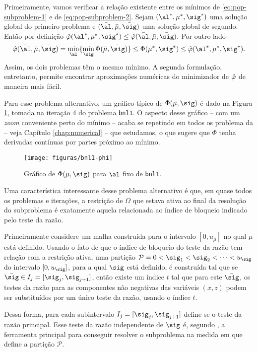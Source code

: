 Primeiramente, vamos verificar a relação existente entre os mínimos de \eqref{eq:pop-subproblem-1} e de \eqref{eq:pop-subproblem-2}. Sejam $(\al^*,\mu^*,\sig^*)$ uma solução global do  primeiro problema e $(\bar{\al}, \bar{\mu},\bar{\sig})$ uma solução global de segundo. Então por definição
$ \nextphi(\al^*,\mu^*,\sig^*) \leq \nextphi (\bar{\al},\bar{\mu},\bar{\sig}).$
Por outro lado 
\[
\nextphi(\baral,\barmu,\barsig) = \min_{\al}\{ \min_{\sig}\Phi(\barmu,\barsig)\} \leq \Phi(\mu^{*},\sig^{*}) \leq \nextphi(\al^*,\mu^*,\sig^*).
\]
Assim, os dois problemas têm o mesmo mínimo. A segunda formulação, entretanto, permite encontrar aproximações numéricas do minimizador de $\hat{\varphi}$ de maneira mais fácil. 

Para esse problema alternativo, um gráfico típico de $\Phi(\mu,\sig)$ é dado na Figura \ref{fig:bnl1-Phi}, tomada na iteração \num{4} do problema \texttt{bnl1}. O aspecto desse gráfico --  com um \emph{zoom} conveniente perto do mínimo --  acaba se repetindo  em todos os problema da  -- veja Capítulo \ref{chap:numerical} -- que estudamos, o que sugere que $\Phi$ tenha derivadas contínuas por partes próximo ao mínimo.

\begin{figure}[htbp]
\centering
\texttt{[image: figuras/bnl1-phi]}
  	\caption{\label{fig:bnl1-Phi} Gráfico de $\Phi(\mu,\sig)$ para $\al$ fixo de \texttt{bnl1}.}
  \end{figure}

 Uma característica interessante desse problema alternativo é que, em quase todos os problemas e iterações, a restrição de $\Omega$ que estava ativa ao final da resolução do subproblema é exatamente aquela relacionada ao índice de bloqueio indicado pelo teste da razão.

Primeiramente considere  um malha construída para o intervalo $[0,u_{\mu}]$ no qual  $\mu$ está definido. Usando o fato de que o índice de bloqueio do teste da razão tem relação com a restrição ativa, uma partição $\mathcal{P} = 0<\sig_{1}<\sig_{2}<\cdots<u_{\sig}$ do intervalo $[0,u_{\sig}]$, para  a  qual $\sig$ está definido, é construída tal que se $\barsig\in I_{j} = [\sig_{j},\sig_{j+1}]$, então existe um índice $t$ tal que para este $\barsig$,  os testes da razão para as componentes não negativas das variáveis $(x,z)$ podem ser substituídos por um único teste da razão, usando o índice $t$. 

Dessa forma, para cada subintervalo $I_{j} = [\sig_{j},\sig_{j+1}]$ define-se o teste da razão principal. Esse teste da razão independente de $\sig$ é, segundo \textcite{VillasBoas:2012ur,VillasBoas2013:wn}, a ferramenta principal para conseguir resolver o subproblema na medida em que define a partição $\mathcal{P}$.

